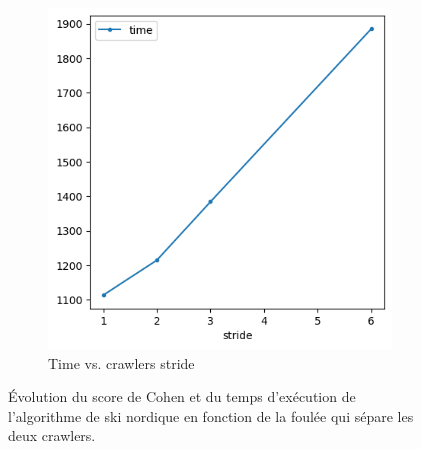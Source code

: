 \documentclass[francais,RandD]{rapportPFE}
\begin{document}
\begin{figure}[h!]
\begin{subfigure}[t]{0.49\linewidth}
					\includegraphics[width=\linewidth]{graphics/ski_nordique-time_vs_stride.png}
					\caption{Time vs. crawlers stride}
					\label{fig:ski_nordique-time_vs_stride}
			\end{subfigure}
			\caption{Évolution du score de Cohen et du temps d'exécution de l'algorithme de ski nordique en fonction de la foulée qui sépare les deux crawlers.}
			\label{fig:ski_nordique-stride}
		\end{figure}
\end{document}
